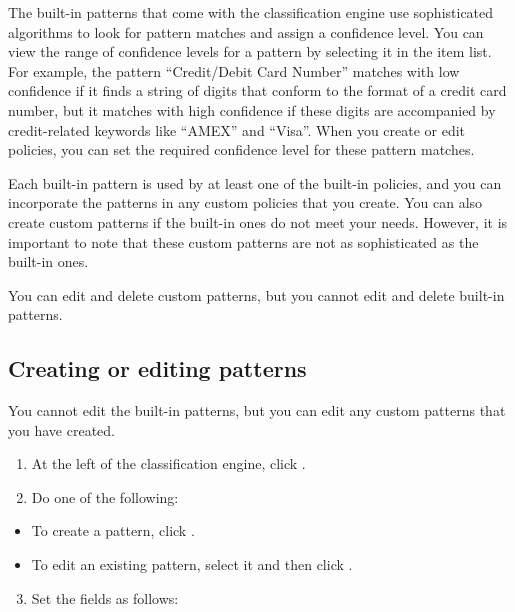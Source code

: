 \documentclass[letterpaper,10pt,english]{sphinxmanual}
\begin{document}
The built-in patterns that come with the classification engine use sophisticated algorithms to look for pattern matches and assign a confidence level. You can view the range of confidence levels for a pattern by selecting it in the item list. For example, the pattern “Credit/Debit Card Number” matches with low confidence if it finds a string of digits that conform to the format of a credit card number, but it matches with high confidence if these digits are accompanied by credit-related keywords like “AMEX” and “Visa”. When you create or edit policies, you can set the required confidence level for these pattern matches.

Each built-in pattern is used by at least one of the built-in policies, and you can incorporate the patterns in any custom policies that you create. You can also create custom patterns if the built-in ones do not meet your needs. However, it is important to note that these custom  patterns are not as sophisticated as the built-in ones.

You can edit and delete custom patterns, but you cannot edit and delete built-in patterns.


\subsection{Creating or editing patterns}
\label{\detokenize{mcdmp_app_ug:creating-or-editing-patterns}}
You cannot edit the built-in patterns, but you can edit any custom patterns that you
have created.

\begin{enumerate}
\item {} 
At the left of the classification engine, click .

\item {} 
Do one of the following:

\end{enumerate}
\begin{itemize}
\item {} 
To create a pattern, click .

\item {} 
To edit an existing pattern, select it and then click .

\end{itemize}
\begin{enumerate}
\setcounter{enumi}{2}
\item {} 
Set the fields as follows:

\end{enumerate}
\end{document}
